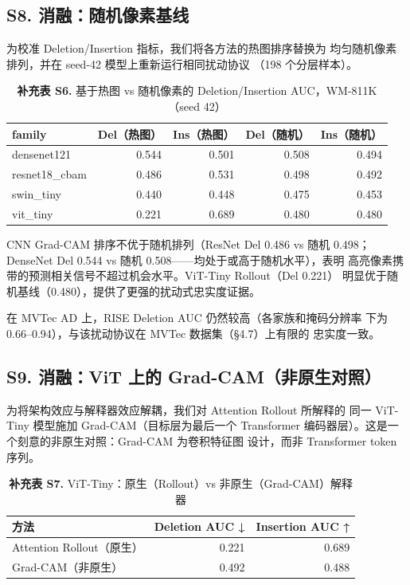 \documentclass[11pt,a4paper]{article}
\begin{document}
\subsection*{S8. 消融：随机像素基线}

为校准 Deletion/Insertion 指标，我们将各方法的热图排序替换为 均匀随机像素排列，并在 seed-42 模型上重新运行相同扰动协议 （198 个分层样本）。

\begin{table}[htbp]
\centering
\small
\caption{\textbf{补充表 S6.} 基于热图 vs 随机像素的 Deletion/Insertion AUC，WM-811K（seed 42）}
\begin{tabular}{lrrrr}
\toprule
family & Del（热图） & Ins（热图） & Del（随机） & Ins（随机） \\
\midrule
densenet121 & 0.544 & 0.501 & 0.508 & 0.494 \\
resnet18\_cbam & 0.486 & 0.531 & 0.498 & 0.492 \\
swin\_tiny & 0.440 & 0.448 & 0.475 & 0.453 \\
vit\_tiny & 0.221 & 0.689 & 0.480 & 0.480 \\
\bottomrule
\end{tabular}
\end{table}

CNN Grad-CAM 排序不优于随机排列（ResNet Del 0.486 vs 随机 0.498； DenseNet Del 0.544 vs 随机 0.508——均处于或高于随机水平），表明 高亮像素携带的预测相关信号不超过机会水平。ViT-Tiny Rollout（Del 0.221） 明显优于随机基线（0.480），提供了更强的扰动式忠实度证据。

在 MVTec AD 上，RISE Deletion AUC 仍然较高（各家族和掩码分辨率 下为 0.66–0.94），与该扰动协议在 MVTec 数据集（§4.7）上有限的 忠实度一致。

\clearpage
{}
\subsection*{S9. 消融：ViT 上的 Grad-CAM（非原生对照）}

为将架构效应与解释器效应解耦，我们对 Attention Rollout 所解释的 同一 ViT-Tiny 模型施加 Grad-CAM（目标层为最后一个 Transformer 编码器层）。这是一个刻意的非原生对照：Grad-CAM 为卷积特征图 设计，而非 Transformer token 序列。

\begin{table}[htbp]
\centering
\small
\caption{\textbf{补充表 S7.} ViT-Tiny：原生（Rollout）vs 非原生（Grad-CAM）解释器}
\begin{tabular}{lrr}
\toprule
方法 & Deletion AUC ↓ & Insertion AUC ↑ \\
\midrule
Attention Rollout（原生） & 0.221 & 0.689 \\
Grad-CAM（非原生） & 0.492 & 0.488 \\
\bottomrule
\end{tabular}
\end{table}
\end{document}
